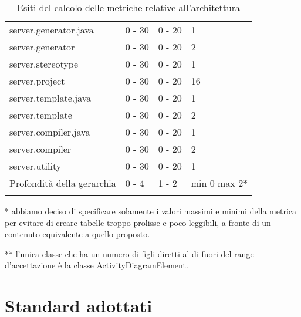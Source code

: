 \begin{longtable}{|p{5.5cm}|p{2.25cm}|p{2.25cm}|p{2.25cm}|}
		server.generator.java &0 - 30 &0 - 20 &1\\
		server.generator &0 - 30 &0 - 20 &2\\
		server.stereotype &0 - 30 &0 - 20 &1\\
		server.project &0 - 30 &0 - 20 &16\\
		server.template.java &0 - 30 &0 - 20 &1\\
		server.template &0 - 30 &0 - 20 &2\\
		server.compiler.java &0 - 30 &0 - 20 &1\\
		server.compiler &0 - 30 &0 - 20 &2\\
		server.utility &0 - 30 &0 - 20 &1\\
		\hline
		Profondità della gerarchia &0 - 4 &1 - 2 &min 0 max 2*\\
		\hline
		\caption{Esiti del calcolo delle metriche relative all'architettura}
		\end{longtable}
	* abbiamo deciso di specificare solamente i valori massimi e minimi della metrica per evitare di creare tabelle troppo prolisse e poco leggibili, a fronte di un contenuto equivalente a quello proposto.
	
	** l'unica classe che ha un numero di figli diretti al di fuori del range d'accettazione è la classe ActivityDiagramElement.




\section{Standard adottati}
